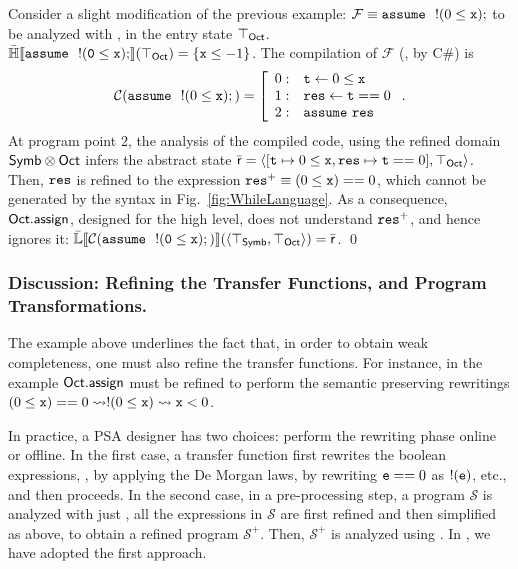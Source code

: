 \documentclass{llncs}
\begin{document}
\begin{example}
Consider a slight modification of the previous example:  $\mathcal{F} \equiv \mathtt{assume}~\ !(0 \leq \mathtt{x});$ to be analyzed with \Octagons, in the entry state ${\top}_{\mathsf{Oct}}$.
$\mathbb{\bar{H}}\llbracket \mathtt{ \mathtt{assume}~\ !(0 \leq \mathtt{x});} \rrbracket({\top}_{\mathsf{Oct}}) = \{ \mathtt{x} \leq -1 \}$.
The compilation of $\mathcal{F}$ (\eg, by C\#) is 
\begin{equation}
  \mathcal{C}( \mathtt{assume}~\ !(0 \leq \mathtt{x});) = \left [
    \begin{array}{r l}
      0: & \mathtt{t} \leftarrow 0 \leq \mathtt{x} \\
      1: & \mathtt{res} \leftarrow \mathtt{t} == 0 \\
      2: & \mathtt{assume}~ \mathtt{res}
    \end{array} \right. .
  \label{ex:comp4}
\end{equation}
At program point $2$, the analysis of the compiled code, using the refined domain $\mathsf{Symb}
\otimes \mathsf{Oct}$ infers the abstract
state $\bar{\mathsf{r}} = \langle [\mathtt{t} \mapsto 0 \leq \mathtt{x}, \mathtt{res}
\mapsto \mathtt{t} == 0], {\top}_{\mathsf{Oct}} \rangle $.  Then, $\mathtt{res}$ is refined
to the expression $\mathtt{res}^+ \equiv (0 \leq \mathtt{x})== 0$, which
cannot be generated by the syntax in Fig.~\ref{fig:WhileLanguage}.  As
a consequence, $\mathsf{Oct}.\mathsf{\mathsf{assign}}$, designed for the high level, does
not understand $\mathtt{res}^+$, and hence ignores it:
$\mathbb{\bar{L}}\llbracket \mathtt{\mathcal{C}(\mathtt{assume}~\ !(0 \leq \mathtt{x});)} \rrbracket(\langle {\ensuremath{\top}}_{\mathsf{Symb}},
{\top}_{\mathsf{Oct}} \rangle) = \bar{\mathsf{r}}$.  \qed
\end{example}

\subsubsection{Discussion: Refining the Transfer Functions, and Program Transformations.}
The example above underlines the fact that, in order to obtain weak
completeness, one must also refine the transfer functions.  For
instance, in the example $\mathsf{Oct}.\mathsf{\mathsf{assign}}$ must be refined to
perform the semantic preserving rewritings $(0 \leq \mathtt{x})== 0
\rightsquigarrow !(0 \leq \mathtt{x}) \rightsquigarrow \mathtt{x} < 0$.

In practice, a PSA designer has two choices: perform the rewriting
phase online or offline.  In the first case, a transfer function first
rewrites the boolean expressions, \eg, by applying the De Morgan laws,
by rewriting $\mathtt{e} == 0$ as $!(\mathtt{e})$, etc., and then
proceeds.  In the second case, in a pre-processing step, a program
$\mathcal{S}$ is analyzed with just \Symbolic, all the expressions in
$\mathcal{S}$ are first refined and then simplified as above, to
obtain a refined program $\mathcal{S}^+$.  Then, $\mathcal{S}^+$
is analyzed using .
In \Clousot{}, we have adopted the first approach.
\end{document}
